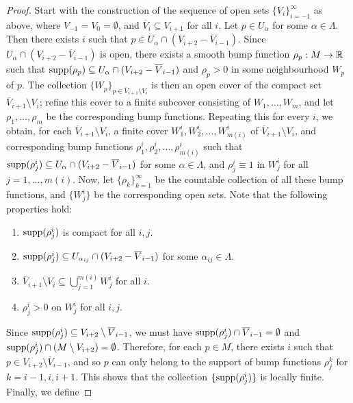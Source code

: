 \begin{proof}
    Start with the construction of the sequence of open sets $\{V_{i}\}_{i=-1}^{\infty}$ as above, where $V_{-1} = V_{0} = \emptyset$, and $\overline{V}_{i} \subseteq V_{i+1}$ for all $i$. Let $p \in U_{\alpha}$ for some $\alpha \in \Lambda$. Then there exists $i$ such that $p \in U_{\alpha} \cap (V_{i+2}-\overline{V}_{i-1})$. Since $U_{\alpha} \cap (V_{i+2}-\overline{V}_{i-1})$ is open, there exists a smooth bump function $\rho_{p}:M \to \mathbb{R}$ such that $\operatorname{supp}(\rho_{p}) \subseteq U_{\alpha} \cap (V_{i+2}-\overline{V}_{i-1})$ and $\rho_{p} > 0$ in some neighbourhood $W_{p}$ of $p$. The collection $\{W_{p}\}_{p \in \overline{V}_{i+1} \setminus V_{i}}$ is then an open cover of the compact set $\overline{V}_{i+1} \setminus V_{i}$; refine this cover to a finite subcover consisting of $W_{1},\ldots,W_{m}$, and let $\rho_{1},\ldots,\rho_{m}$ be the corresponding bump functions. Repeating this for every $i$, we obtain, for each $\overline{V}_{i+1}\setminus V_{i}$, a finite cover $W_{1}^{i},W_{2}^{i},\ldots,W_{m(i)}^{i}$ of $\overline{V}_{i+1}\setminus V_{i}$, and corresponding bump functions $\rho_{1}^{i},\rho_{2}^{i},\ldots,\rho_{m(i)}^{i}$ such that $\operatorname{supp}(\rho_{j}^{i}) \subseteq U_{\alpha} \cap (V_{i+2}-\overline{V}_{i-1})$ for some $\alpha \in \Lambda$, and $\rho_{j}^{i} \equiv 1$ in $W_{j}^{i}$ for all $j = 1,\ldots,m(i)$. Now, let $\{\rho_{k}\}_{k=1}^{\infty}$ be the countable collection of all these bump functions, and $\{W_{j}^{i}\}$ be the corresponding open sets. Note that the following properties hold:
    \begin{enumerate}
        \item $\operatorname{supp}(\rho_{j}^{i})$ is compact for all $i,j$.
        \item $\operatorname{supp}(\rho_{j}^{i}) \subseteq U_{\alpha_{ij}} \cap (V_{i+2}-\overline{V}_{i-1})$ for some $\alpha_{ij} \in \Lambda$.
        \item $\overline{V}_{i+1} \setminus V_{i} \subseteq \bigcup_{j=1}^{m(i)} W_{j}^{i}$ for all $i$.
        \item $\rho_{j}^{i} > 0$ on $W_{j}^{i}$ for all $i,j$.
    \end{enumerate}
    Since $\operatorname{supp}(\rho_{j}^{i}) \subseteq V_{i+2} \setminus \overline{V}_{i-1}$, we must have $\operatorname{supp}(\rho_{j}^{i}) \cap \overline{V}_{i-1} = \emptyset$ and $\operatorname{supp}(\rho_{j}^{i}) \cap (M \setminus V_{i+2}) = \emptyset$. Therefore, for each $p \in M$, there exists $i$ such that $p \in V_{i+2} \setminus \overline{V}_{i-1}$, and so $p$ can only belong to the support of bump functions $\rho_{j}^{k}$ for $k = i-1,i,i+1$. This shows that the collection $\{\operatorname{supp}(\rho_{j}^{i})\}$ is locally finite. Finally, we define

\end{proof}
